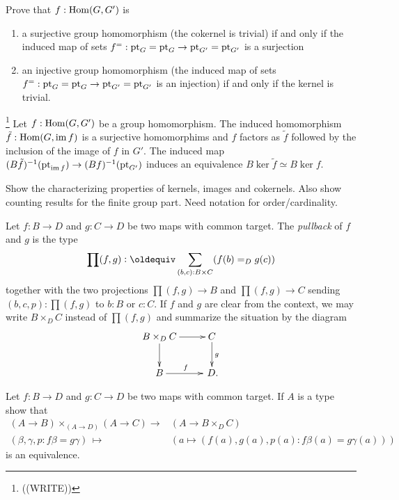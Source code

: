 \begin{xca}
  Prove that $f:\mathrm{Hom}(G,G')$ is
  \begin{enumerate}
  \item a surjective group homomorphism (\ie the cokernel is trivial) if and only if the induced map of sets $f^=:{\mathord{\mathrm{pt}}}_G={\mathord{\mathrm{pt}}}_G\to{\mathord{\mathrm{pt}}}_{G'}={\mathord{\mathrm{pt}}}_{G'}$ is a surjection
  \item an injective group homomorphism (\ie the induced map of sets $f^=:{\mathord{\mathrm{pt}}}_G={\mathord{\mathrm{pt}}}_G\to{\mathord{\mathrm{pt}}}_{G'}={\mathord{\mathrm{pt}}}_{G'}$ is an injection) if and only if the kernel is trivial.
  \end{enumerate}
\end{xca}

\begin{lemma}
  \label{lem:kerandcoker}\footnote{((WRITE))}
  \label{lem:countinggps}
  Let $f:\mathrm{Hom}(G,G')$ be a group homomorphism.  The induced homomorphism $\tilde f:\mathrm{Hom}(G,\mathrm{im}\, f)$ is a surjective homomorphims and $f$ factors as $\tilde f$ followed by the inclusion of the image of $f$ in $G'$.  The induced map $(B\tilde f)^{-1}({\mathord{\mathrm{pt}}}_{\mathrm{im}\, f})\to (Bf)^{-1}({\mathord{\mathrm{pt}}}_{G'})$ induces an equivalence $B\ker\tilde f\simeq B\ker f$.

Show the characterizing properties of kernels, images and cokernels.   Also show counting results for the finite group part.  Need notation for order/cardinality.
\end{lemma}


\begin{definition}
  \label{def:pullback}
  Let $f:B\to D$ and $g:C\to D$ be two maps with common target.  The \emph{pullback} of $f$ and $g$ is the type 
$$\prod(f,g)\defequi\sum_{(b,c):B\times C}(f(b)=_Dg(c))$$
together with the two projections $\prod(f,g)\to B$ and $\prod(f,g)\to C$ sending $(b,c,p):\prod(f,g)$ to $b:B$ or $c:C$.  If $f$ and $g$ are clear from the context, we may write $B\times_DC$ instead of $\prod(f,g)$ and summarize the situation by the diagram
$$\xymatrix{B\times_DC\ar[r]\ar[d]&C\ar[d]^g\\B\ar[r]^f&\,D.}$$
\end{definition}
\begin{xca}
  Let $f:B\to D$ and $g:C\to D$ be two maps with common target.  If $A$ is a type show that 
  \begin{align*}
    (A\to B)\times_{(A\to D)}(A\to C)\to &(A\to B\times_DC)\\ 
(\beta,\gamma,p:f\beta=g\gamma)\,\mapsto\,&(a\mapsto (f(a),g(a),p(a):f\beta(a)=g\gamma(a)))
  \end{align*}
 is an equivalence.
\end{xca}

